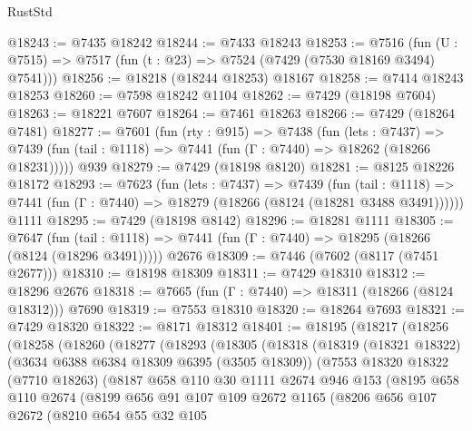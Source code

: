\begin{lexlean}{RustStd}
\begin{coremodule}
@18243 := @7435 @18242
@18244 := @7433 @18243
@18253 := @7516
    (fun (U : @7515) => @7517 (fun (t : @23) => @7524 (@7429 (@7530 @18169 @3494) @7541)))
@18256 := @18218 (@18244 @18253) @18167
@18258 := @7414 @18243 @18253
@18260 := @7598 @18242 @1104
@18262 := @7429 (@18198 @7604)
@18263 := @18221 @7607
@18264 := @7461 @18263
@18266 := @7429 (@18264 @7481)
@18277 := @7601
    (fun (rty : @915) =>
    @7438
      (fun (lets : @7437) =>
      @7439 (fun (tail : @1118) => @7441 (fun (Γ : @7440) => @18262 (@18266 @18231)))))
    @939
@18279 := @7429 (@18198 @8120)
@18281 := @8125 @18226 @18172
@18293 := @7623
    (fun (lets : @7437) =>
    @7439
      (fun (tail : @1118) =>
      @7441 (fun (Γ : @7440) => @18279 (@18266 (@8124 (@18281 @3488 @3491))))))
    @1111
@18295 := @7429 (@18198 @8142)
@18296 := @18281 @1111
@18305 := @7647
    (fun (tail : @1118) => @7441 (fun (Γ : @7440) => @18295 (@18266 (@8124 (@18296 @3491)))))
    @2676
@18309 := @7446 (@7602 (@8117 (@7451 @2677)))
@18310 := @18198 @18309
@18311 := @7429 @18310
@18312 := @18296 @2676
@18318 := @7665 (fun (Γ : @7440) => @18311 (@18266 (@8124 @18312))) @7690
@18319 := @7553 @18310
@18320 := @18264 @7693
@18321 := @7429 @18320
@18322 := @8171 @18312
@18401 := @18195
    (@18217
      (@18256
        (@18258
          (@18260
            (@18277
              (@18293
                (@18305
                  (@18318
                    (@18319
                      (@18321 @18322)
                      (@3634 @6388 @6384 @18309 @6395 (@3505 @18309))
                      (@7553
                        @18320
                        @18322
                        (@7710 @18263)
                        (@8187
                          @658
                          @110
                          @30
                          @1111
                          @2674
                          @946
                          @153
                          (@8195
                            @658
                            @110
                            @2674
                            (@8199
                              @656
                              @91
                              @107
                              @109
                              @2672
                              @1165
                              (@8206
                                @656
                                @107
                                @2672
                                (@8210
                                  @654
                                  @55
                                  @32
                                  @105

\end{coremodule}
\end{lexlean}
